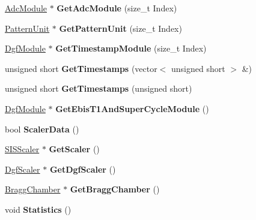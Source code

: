 \begin{DoxyCompactItemize}
\item 
\mbox{\label{class_unpacked_event_a481fd2e7637bb38890e2e12ae51b4bcc}} 
\hyperlink{class_adc_module}{Adc\+Module} $\ast$ {\bfseries Get\+Adc\+Module} (size\+\_\+t Index)
\item 
\mbox{\label{class_unpacked_event_a745192df038ac608501642b12e362460}} 
\hyperlink{class_pattern_unit}{Pattern\+Unit} $\ast$ {\bfseries Get\+Pattern\+Unit} (size\+\_\+t Index)
\item 
\mbox{\label{class_unpacked_event_afea632b950f2cf8ea9fa04b1f5524c38}} 
\hyperlink{class_dgf_module}{Dgf\+Module} $\ast$ {\bfseries Get\+Timestamp\+Module} (size\+\_\+t Index)
\item 
\mbox{\label{class_unpacked_event_a7ac2922807426765fc158f7171e6ae06}} 
unsigned short {\bfseries Get\+Timestamps} (vector$<$ unsigned short $>$ \&)
\item 
\mbox{\label{class_unpacked_event_a1823ddca4adcbc26861072ff45bcc737}} 
unsigned short {\bfseries Get\+Timestamps} (unsigned short)
\item 
\mbox{\label{class_unpacked_event_aecb283a228b877c6644ab0da5ba1aa96}} 
\hyperlink{class_dgf_module}{Dgf\+Module} $\ast$ {\bfseries Get\+Ebis\+T1\+And\+Super\+Cycle\+Module} ()
\item 
\mbox{\label{class_unpacked_event_a9a7536c85e4cdbf09e8cd9e8960c67a6}} 
bool {\bfseries Scaler\+Data} ()
\item 
\mbox{\label{class_unpacked_event_a779dc661d6fe806b5cac503984943439}} 
\hyperlink{class_s_i_s_scaler}{S\+I\+S\+Scaler} $\ast$ {\bfseries Get\+Scaler} ()
\item 
\mbox{\label{class_unpacked_event_af4a9a5fcfd0b2658e167f64c67c73068}} 
\hyperlink{class_dgf_scaler}{Dgf\+Scaler} $\ast$ {\bfseries Get\+Dgf\+Scaler} ()
\item 
\mbox{\label{class_unpacked_event_aaeac1edfe26995fb9c8f4b7349f0cc79}} 
\hyperlink{class_bragg_chamber}{Bragg\+Chamber} $\ast$ {\bfseries Get\+Bragg\+Chamber} ()
\item 
\mbox{\label{class_unpacked_event_a9860faeecdcbc7758d0889c9bd8f51de}} 
void {\bfseries Statistics} ()
\end{DoxyCompactItemize}
